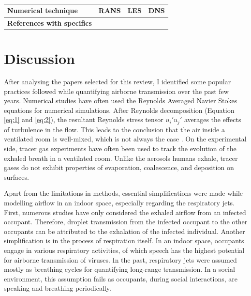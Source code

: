 \documentclass[a4paper,12pt]{elsarticle}
\begin{document}
\begin{table}[ht]
    \centering
    \begin{tabular}{|m{2.5cm}|m{4cm}|m{4cm}|m{4cm}|}
    \hline
     \textbf{Numerical technique} & \textbf{RANS} & \textbf{LES} & \textbf{DNS} \\
    \hline
    \textbf{References with specifics} & & & \\
    \hline
    \end{tabular}
    \caption{}
    \label{tab:num}
\end{table}

\section{Discussion}

After analysing the papers selected for this review, I identified some popular practices followed while quantifying airborne transmission over the past few years. Numerical studies have often used the Reynolds Averaged Navier Stokes equations for numerical simulations. After Reynolds decomposition (Equation \ref{eq:1} and \ref{eq:2}), the resultant Reynolds stress tensor $\overline{u_i'u_j'}$ averages the effects of turbulence in the flow. This leads to the conclusion that the air inside a ventilated room is well-mixed, which is not always the case \cite{salinas2022improved}. On the experimental side, tracer gas experiments have often been used to track the evolution of the exhaled breath in a ventilated room. Unlike the aerosols humans exhale, tracer gases do not exhibit properties of evaporation, coalescence, and deposition on surfaces. 

Apart from the limitations in methods, essential simplifications were made while modelling airflow in an indoor space, especially regarding the respiratory jets. First, numerous studies have only considered the exhaled airflow from an infected occupant. Therefore, droplet transmission from the infected occupant to the other occupants can be attributed to the exhalation of the infected individual. Another simplification is in the process of respiration itself. In an indoor space, occupants engage in various respiratory activities, of which speech has the highest potential for airborne transmission of viruses. In the past, respiratory jets were assumed mostly as breathing cycles for quantifying long-range transmission. In a social environment, this assumption fails as occupants, during social interactions, are speaking and breathing periodically.
\end{document}
